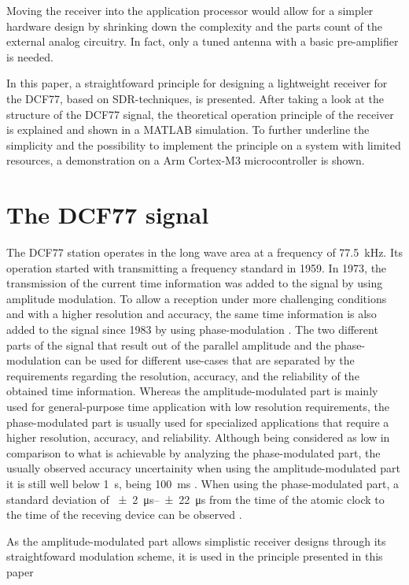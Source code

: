 \documentclass[conference]{IEEEtran}
\begin{document}
Moving the receiver into the application processor would allow for a simpler hardware design by shrinking down the complexity and the parts count of the
external analog circuitry. In fact, only a tuned antenna with a basic pre-amplifier is needed.
\par
In this paper, a straightfoward principle for designing a lightweight receiver for the DCF77, based on SDR-techniques, is presented.
After taking a look at the structure of the DCF77 signal, the theoretical operation principle of the receiver is explained and shown in a MATLAB simulation.
To further underline the simplicity and the possibility to implement the principle on a system with limited resources, a demonstration on a Arm Cortex-M3 microcontroller
is shown.

\section{The DCF77 signal}
The DCF77 station operates in the long wave area at a frequency of \SI{77.5}{\kilo\hertz}.
Its operation started with transmitting a frequency standard in 1959.
In 1973, the transmission of the current time information was added to the signal by using amplitude modulation.
To allow a reception under more challenging conditions and with a higher resolution and accuracy, the same time information is also added to the signal since 1983 by using
phase-modulation \cite{b3}.
The two different parts of the signal that result out of the parallel amplitude and the phase-modulation can be used for different use-cases that are separated by the
requirements regarding the resolution, accuracy, and the reliability of the obtained time information. 
Whereas the amplitude-modulated part is mainly used for general-purpose time application with low resolution requirements, the phase-modulated part is usually used
for specialized applications that require a higher resolution, accuracy, and reliability.
Although being considered as low in comparison to what is achievable by analyzing the phase-modulated part, the usually observed accuracy uncertainity when using the
amplitude-modulated part it is still well below \SI{1}{\second}, being \SI{100}{\milli\second} \cite{b2}.
When using the phase-modulated part, a standard deviation of \SIrange{\pm 2}{\pm 22}{\micro\second} from the time of the atomic clock to the time of the receving device can be observed \cite{b4}.
\par
As the amplitude-modulated part allows simplistic receiver designs through its straightfoward modulation scheme, it is used in the principle presented in this paper
\end{document}
